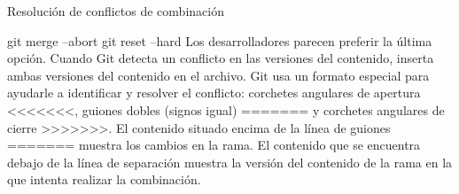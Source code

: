 Resolución de conflictos de combinación

    git merge --abort
    git reset --hard
    Los desarrolladores parecen preferir la última opción. Cuando Git detecta un conflicto en las versiones del contenido, inserta ambas versiones del contenido en el archivo. Git usa un formato especial para ayudarle a identificar y resolver el conflicto: corchetes angulares de apertura <<<<<<<, guiones dobles (signos igual) ======= y corchetes angulares de cierre >>>>>>>. El contenido situado encima de la línea de guiones ======= muestra los cambios en la rama. El contenido que se encuentra debajo de la línea de separación muestra la versión del contenido de la rama en la que intenta realizar la combinación.

